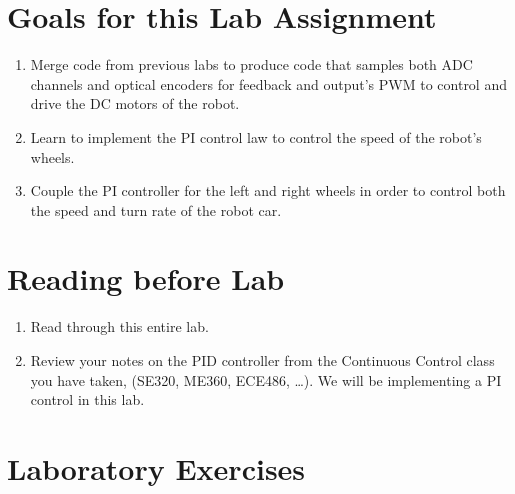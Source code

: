 \documentclass[11pt]{article}
\begin{document}
\MakeAssignmentTitle

\section*{Goals for this Lab Assignment}
%
\begin{enumerate}
    \item Merge code from previous labs to produce code that samples both ADC channels and optical encoders for feedback and output’s PWM to control and drive the DC motors of the robot.
    \item Learn to implement the PI control law to control the speed of the robot’s wheels.
    \item Couple the PI controller for the left and right wheels in order to control both the speed and turn rate of the robot car.
\end{enumerate}
%
\section*{Reading before Lab}
%
\begin{enumerate}
    \item Read through this entire lab.
    \item Review your notes on the PID controller from the Continuous Control class you have taken, (SE320, ME360, ECE486, …). We will be implementing a PI control in this lab.
\end{enumerate}
%
\section*{Laboratory Exercises}

\end{document}
